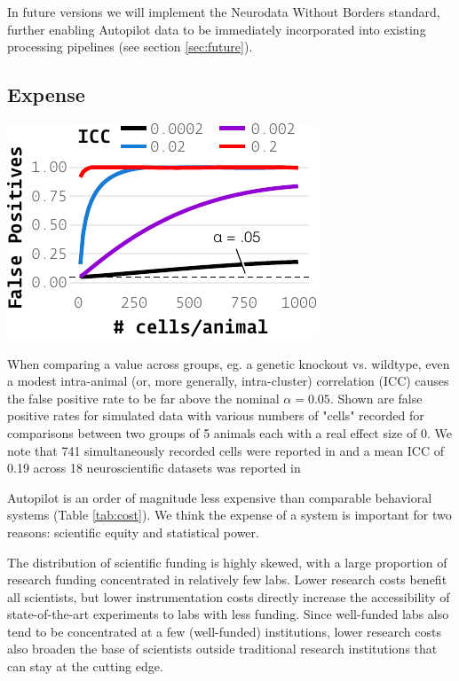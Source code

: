 \documentclass[nohyper, justified, notitlepage, marginals=raggedright,twoside=false,debug]{tufte-autopilot}
\begin{document}
In future versions we will implement the Neurodata Without Borders standard\citep{rubelNWBAccessibleData2019}, further enabling Autopilot data to be immediately incorporated into existing processing pipelines (see section \ref{sec:future}).

\subsection{Expense}
\label{sec:expense}

\begin{marginfigure}[2.6cm]
\includegraphics[]{figures/fpr.pdf}
\caption{When comparing a value across groups, eg. a genetic knockout vs. wildtype, even a modest intra-animal (or, more generally, intra-cluster) correlation (ICC) causes the false positive rate to be far above the nominal $\alpha = 0.05$. Shown are false positive rates for simulated data with various numbers of "cells" recorded for comparisons between two groups of 5 animals each with a real effect size of 0. We note that 741 simultaneously recorded cells were reported in \citep{junFullyIntegratedSilicon2017} and a mean ICC of 0.19 across 18 neuroscientific datasets was reported in \citep{aartsSolutionDependencyUsing2014}}
\label{fig:icc}
\end{marginfigure}

Autopilot is an order of magnitude less expensive than comparable behavioral systems (Table \ref{tab:cost}). We think the expense of a system is important for two reasons: scientific equity and statistical power. 

The distribution of scientific funding is highly skewed, with a large proportion of research funding concentrated in relatively few labs\citep{katzBiomedicalEliteInequality2017}. Lower research costs benefit all scientists, but lower instrumentation costs directly increase the accessibility of state-of-the-art experiments to labs with less funding. Since well-funded labs also tend to be concentrated at a few (well-funded) institutions, lower research costs also broaden the base of scientists outside traditional research institutions that can stay at the cutting edge\citep{ashkenasEvenAffirmativeAction2017,clausetSystematicInequalityHierarchy2015,pearceExpandingEquitableAccess2019}.
\end{document}
